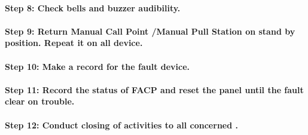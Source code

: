 \paragraph{Step 8: Check bells and buzzer audibility.}

\paragraph{Step 9: Return Manual Call Point /Manual Pull Station on stand by position. Repeat it on all device.}

\paragraph{Step 10: Make a record for the fault device.}

\paragraph{Step 11: Record the status of FACP and reset the panel until the fault clear on trouble.}

\paragraph{Step 12: Conduct closing of activities to all concerned .}

